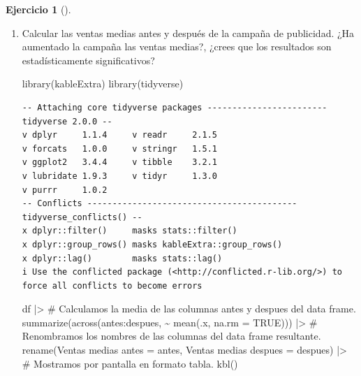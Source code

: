 \documentclass[
  a4paper,
]{scrreport}
\newenvironment{Shaded}{\begin{snugshade}}{\end{snugshade}}
\newcommand{\AttributeTok}[1]{\textcolor[rgb]{0.40,0.45,0.13}{#1}}
\newcommand{\CommentTok}[1]{\textcolor[rgb]{0.37,0.37,0.37}{#1}}
\newcommand{\ConstantTok}[1]{\textcolor[rgb]{0.56,0.35,0.01}{#1}}
\newcommand{\FunctionTok}[1]{\textcolor[rgb]{0.28,0.35,0.67}{#1}}
\newcommand{\NormalTok}[1]{\textcolor[rgb]{0.00,0.23,0.31}{#1}}
\newcommand{\OtherTok}[1]{\textcolor[rgb]{0.00,0.23,0.31}{#1}}
\newcommand{\SpecialCharTok}[1]{\textcolor[rgb]{0.37,0.37,0.37}{#1}}
\newcommand{\StringTok}[1]{\textcolor[rgb]{0.13,0.47,0.30}{#1}}
\theoremstyle{definition}
\newtheorem{exercise}{Ejercicio}[chapter]
\theoremstyle{remark}
\begin{document}
\begin{exercise}[]
\begin{enumerate}
\begin{tcolorbox}
  \end{tcolorbox}
\item
  Calcular las ventas medias antes y después de la campaña de
  publicidad. ¿Ha aumentado la campaña las ventas medias?, ¿crees que
  los resultados son estadísticamente significativos?

  \begin{tcolorbox}[enhanced jigsaw, coltitle=black, left=2mm, colback=white, leftrule=.75mm, toptitle=1mm, breakable, bottomrule=.15mm, titlerule=0mm, bottomtitle=1mm, title=\textcolor{quarto-callout-tip-color}{\faLightbulb}\hspace{0.5em}{Solución}, arc=.35mm, toprule=.15mm, rightrule=.15mm, colframe=quarto-callout-tip-color-frame, opacityback=0, colbacktitle=quarto-callout-tip-color!10!white, opacitybacktitle=0.6]

\begin{Shaded}
\begin{Highlighting}[]
\FunctionTok{library}\NormalTok{(kableExtra)}
\FunctionTok{library}\NormalTok{(tidyverse)}
\end{Highlighting}
\end{Shaded}

\begin{verbatim}
-- Attaching core tidyverse packages ------------------------ tidyverse 2.0.0 --
v dplyr     1.1.4     v readr     2.1.5
v forcats   1.0.0     v stringr   1.5.1
v ggplot2   3.4.4     v tibble    3.2.1
v lubridate 1.9.3     v tidyr     1.3.0
v purrr     1.0.2     
-- Conflicts ------------------------------------------ tidyverse_conflicts() --
x dplyr::filter()     masks stats::filter()
x dplyr::group_rows() masks kableExtra::group_rows()
x dplyr::lag()        masks stats::lag()
i Use the conflicted package (<http://conflicted.r-lib.org/>) to force all conflicts to become errors
\end{verbatim}

\begin{Shaded}
\begin{Highlighting}[]
\NormalTok{df }\SpecialCharTok{|\textgreater{}} 
    \CommentTok{\# Calculamos la media de las columnas antes y despues del data frame.}
    \FunctionTok{summarize}\NormalTok{(}\FunctionTok{across}\NormalTok{(antes}\SpecialCharTok{:}\NormalTok{despues, }\SpecialCharTok{\textasciitilde{}} \FunctionTok{mean}\NormalTok{(.x, }\AttributeTok{na.rm =} \ConstantTok{TRUE}\NormalTok{))) }\SpecialCharTok{|\textgreater{}} 
    \CommentTok{\# Renombramos los nombres de las columnas del data frame resultante.}
    \FunctionTok{rename}\NormalTok{(}\StringTok{\textasciigrave{}}\AttributeTok{Ventas medias antes}\StringTok{\textasciigrave{}} \OtherTok{=}\NormalTok{ antes, }\StringTok{\textasciigrave{}}\AttributeTok{Ventas medias despues}\StringTok{\textasciigrave{}} \OtherTok{=}\NormalTok{ despues) }\SpecialCharTok{|\textgreater{}} 
    \CommentTok{\# Mostramos por pantalla en formato tabla.}
    \FunctionTok{kbl}\NormalTok{()}
\end{Highlighting}
\end{Shaded}


\end{tcolorbox}
\end{enumerate}
\end{exercise}
\end{document}

